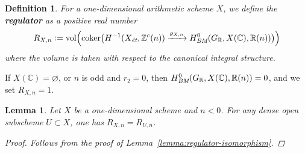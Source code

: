 \documentclass[draft]{article}
\DeclareMathOperator{\coker}{coker}
\DeclareMathOperator{\vol}{vol}
\newcommand{\CC}{\mathbb{C}}
\newcommand{\RR}{\mathbb{R}}
\newcommand{\ZZ}{\mathbb{Z}}
\renewcommand{\emptyset}{\varnothing}
\newcommand{\BM}{\text{\it BM}}
\newcommand{\et}{\text{\it \'{e}t}}
\newcommand{\dfn}{\mathrel{\mathop:}=}
\theoremstyle{myplain}
\newtheorem{lemma}[theorem]{Lemma}
\theoremstyle{mydefinition}
\newtheorem{definition}[theorem]{Definition}
\numberwithin{equation}{section}
\begin{document}
\begin{definition}
  \label{dfn:regulator}
  For a one-dimensional arithmetic scheme $X$, we define the \textbf{regulator}
  as a positive real number
  \[ R_{X,n} \dfn \vol \Bigl(\coker \bigl(
    H^{-1} (X_\et, \ZZ^c (n)) \xrightarrow{\varrho_{X,n}}
    H^0_\BM (G_\RR, X(\CC), \RR(n))
    \bigr)\Bigr) \]
  where the volume is taken with respect to the canonical integral structure.
\end{definition}

If $X(\CC) = \emptyset$, or $n$ is odd and $r_2 = 0$, then
$H^0_\BM (G_\RR, X(\CC), \RR (n)) = 0$, and we set $R_{X,n} = 1$.

\begin{lemma}
  \label{lemma:regulator-dense-open-subset}
  Let $X$ be a one-dimensional scheme and $n < 0$. For any dense open subscheme
  $U \subset X$, one has $R_{X,n} = R_{U,n}$.

  \begin{proof}
    Follows from the proof of Lemma~\ref{lemma:regulator-isomorphism}.
  \end{proof}
\end{lemma}
\end{document}
